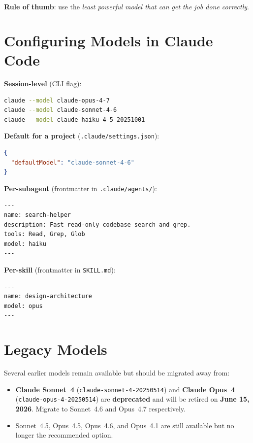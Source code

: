 \textbf{Rule of thumb}: use the \emph{least powerful model that can get the
job done correctly}.

\section{Configuring Models in Claude Code}
\label{sec:model-config}


\textbf{Session-level} (CLI flag):
\begin{lstlisting}[language=bash,caption={Selecting a model for a session}]
claude --model claude-opus-4-7
claude --model claude-sonnet-4-6
claude --model claude-haiku-4-5-20251001
\end{lstlisting}

\textbf{Default for a project} (\texttt{.claude/settings.json}):
\begin{lstlisting}[language=json,caption={Setting the project default model}]
{
  "defaultModel": "claude-sonnet-4-6"
}
\end{lstlisting}

\textbf{Per-subagent} (frontmatter in \texttt{.claude/agents/}):
\begin{lstlisting}[caption={Assigning Haiku to a search-focused subagent}]
---
name: search-helper
description: Fast read-only codebase search and grep.
tools: Read, Grep, Glob
model: haiku
---
\end{lstlisting}

\textbf{Per-skill} (frontmatter in \texttt{SKILL.md}):
\begin{lstlisting}[caption={Routing a skill to Opus for architecture work}]
---
name: design-architecture
model: opus
---
\end{lstlisting}

\section{Legacy Models}
\label{sec:model-legacy}


Several earlier models remain available but should be migrated away from:

\begin{itemize}
  \item \textbf{Claude Sonnet~4} (\texttt{claude-sonnet-4-20250514}) and
        \textbf{Claude Opus~4} (\texttt{claude-opus-4-20250514}) are
        \textbf{deprecated} and will be retired on \textbf{June 15, 2026}.
        Migrate to Sonnet~4.6 and Opus~4.7 respectively.
  \item Sonnet~4.5, Opus~4.5, Opus~4.6, and Opus~4.1 are still available
        but no longer the recommended option.
\end{itemize}


